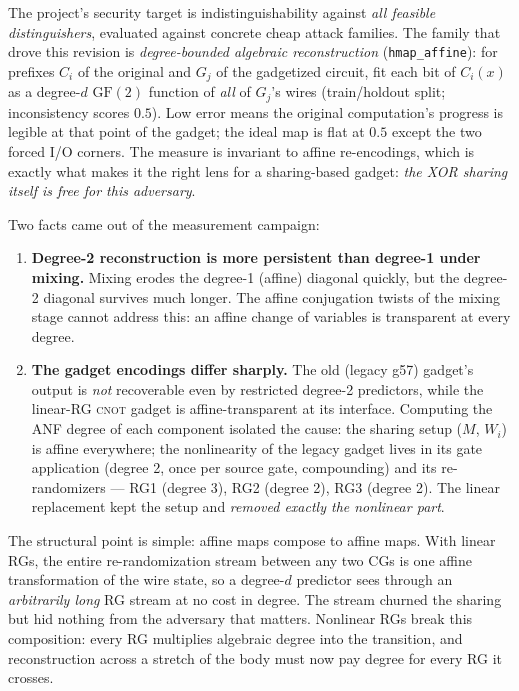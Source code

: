 \documentclass[11pt]{article}
\newcommand{\CNOT}{\textsc{cnot}}
\newcommand{\code}[1]{\texttt{#1}}
\newcommand{\gf}{\mathrm{GF}(2)}
\begin{document}
The project's security target is indistinguishability against \emph{all
feasible distinguishers}, evaluated against concrete cheap attack
families. The family that drove this revision is \emph{degree-bounded
algebraic reconstruction} (\code{hmap\_affine}): for prefixes $C_i$ of the
original and $G_j$ of the gadgetized circuit, fit each bit of $C_i(x)$ as
a degree-$d$ $\gf$ function of \emph{all} of $G_j$'s wires (train/holdout
split; inconsistency scores $0.5$). Low error means the original
computation's progress is legible at that point of the gadget; the ideal
map is flat at $0.5$ except the two forced I/O corners. The measure is
invariant to affine re-encodings, which is exactly what makes it the right
lens for a sharing-based gadget: \emph{the XOR sharing itself is free for
this adversary}.

Two facts came out of the measurement campaign:

\begin{enumerate}
\item \textbf{Degree-2 reconstruction is more persistent than degree-1
under mixing.} Mixing erodes the degree-1 (affine) diagonal quickly, but
the degree-2 diagonal survives much longer. The affine conjugation twists
of the mixing stage cannot address this: an affine change of variables is
transparent at every degree.
\item \textbf{The gadget encodings differ sharply.} The old (legacy g57)
gadget's output is \emph{not} recoverable even by restricted degree-2
predictors, while the linear-RG \CNOT{} gadget is affine-transparent at
its interface. Computing the ANF degree of each component isolated the
cause: the sharing setup ($M$, $W_i$) is affine everywhere; the
nonlinearity of the legacy gadget lives in its gate application (degree
2, once per source gate, compounding) and its re-randomizers --- RG1
(degree 3), RG2 (degree 2), RG3 (degree 2). The linear replacement kept
the setup and \emph{removed exactly the nonlinear part}.
\end{enumerate}

The structural point is simple: affine maps compose to affine maps. With
linear RGs, the entire re-randomization stream between any two CGs is one
affine transformation of the wire state, so a degree-$d$ predictor sees
through an \emph{arbitrarily long} RG stream at no cost in degree. The
stream churned the sharing but hid nothing from the adversary that
matters. Nonlinear RGs break this composition: every RG multiplies
algebraic degree into the transition, and reconstruction across a stretch
of the body must now pay degree for every RG it crosses.
\end{document}
